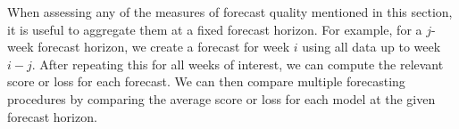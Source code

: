 When assessing any of the measures of forecast quality mentioned in this section, it is useful to aggregate them at a fixed forecast horizon.
For example, for a $j$-week forecast horizon, we create a forecast for week \( i \) using all data up to week \( i - j \).
After repeating this for all weeks of interest, we can compute the relevant score or loss for each forecast.
We can then compare multiple forecasting procedures by comparing the average score or loss for each model at the given forecast horizon.